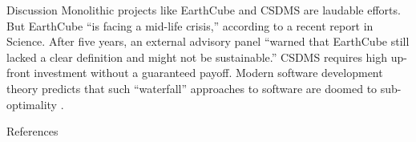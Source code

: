 \documentclass[final]{beamer}
\newlength{\onecolwid}
\begin{document}
\begin{frame}[t]
\begin{columns}[t]
\begin{column}{\onecolwid}
\begin{block}{Discussion}
    Monolithic projects like EarthCube and CSDMS are laudable efforts. But EarthCube ``is facing a mid-life crisis,''
    according to a recent report in Science. After five years, an external advisory panel ``warned that EarthCube
    still lacked a clear definition and might not be sustainable.''\cite{Witze2016}
    CSDMS requires high up-front investment without a
    guaranteed payoff.
    Modern software development theory predicts that such ``waterfall'' approaches to software are
    doomed to sub-optimality \cite{Sutherland2014}.
\end{block}


%
%


\begin{block}{References}

\small{
\vspace{0.75in}}

\end{block}



\end{column}
\end{columns}
\end{frame}
\end{document}
